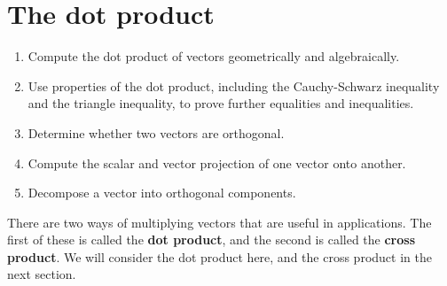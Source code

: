 \section{The dot product}
\label{sec:dot-product}

\begin{outcome}
  \begin{enumerate}
  \item Compute the dot product of vectors geometrically and
    algebraically.
  \item Use properties of the dot product, including the
    Cauchy-Schwarz inequality and the triangle inequality, to prove
    further equalities and inequalities.
  \item Determine whether two vectors are orthogonal.
  \item Compute the scalar and vector projection of one vector onto
    another.
  \item Decompose a vector into orthogonal components.
  \end{enumerate}
\end{outcome}

There are two ways of multiplying vectors that are useful in
applications. The first of these is called the \textbf{dot product},
and the second is called the \textbf{cross product}. We will consider
the dot product here, and the cross product in the next section.

